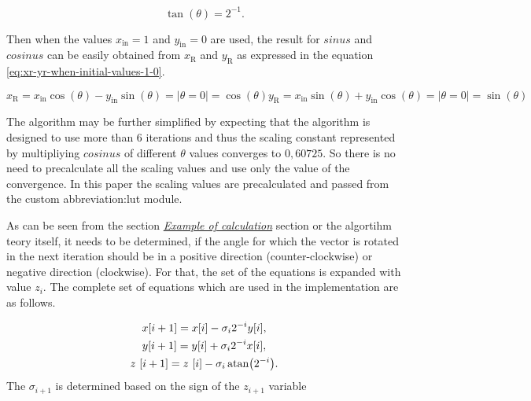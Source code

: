 \documentclass[a4paper, twoside, 11pt]{article}
\begin{document}
        \begin{equation}\label{eq:tan-theta-2}
            \tan (\theta) = 2^{-1}.
        \end{equation}
        \par
        Then when the values $x_\text{in} = 1$ and $y_\text{in} = 0$ are used, the result for $sinus$ and $cosinus$ can be easily obtained from $x_\text{R}$ and $y_\text{R}$ as expressed in the equation \ref{eq:xr-yr-when-initial-values-1-0}.

        \begin{equation}\label{eq:xr-yr-when-initial-values-1-0}
            x_\text{R} = x_\text{in} \cos (\theta) - y_\text{in} \sin (\theta) = | \theta = 0 | = \cos (\theta)
            y_\text{R} = x_\text{in} \sin (\theta) + y_\text{in} \cos (\theta) = | \theta = 0 | = \sin (\theta)
        \end{equation}

            The algorithm may be further simplified by expecting that the algorithm is designed to use more than 6 iterations and thus the scaling constant represented by multipliying $cosinus$ of different $\theta$ values converges to $0,60725$. So there is no need to precalculate all the scaling values and use only the value of the convergence. In this paper the scaling values are precalculated and passed from the custom \gls{abbreviation:lut} module.\par
            As can be seen from the section \hyperref[subsubsec:example-of-calculation]{\textit{Example of calculation}} section or the algortihm teory itself, it needs to be determined, if the angle for which the vector is rotated in the next iteration should be in a positive direction (counter-clockwise) or negative direction (clockwise). For that, the set of the equations is expanded with value $z_i$. The complete set of equations which are used in the implementation are as follows.

            \begin{equation}
                \begin{gathered}
                x [i+1] = x [i] - \sigma_i 2^{-i} y[i],\\
                y [i+1] = y [i] + \sigma_i 2^{-i} x[i],\\
                z~[i+1] = z~[i] - \sigma_i \atan (2^{-i}).
                \end{gathered}
            \end{equation}
            The $\sigma_{i+1}$ is determined based on the sign of the $z_{i+1}$ variable
\end{document}
